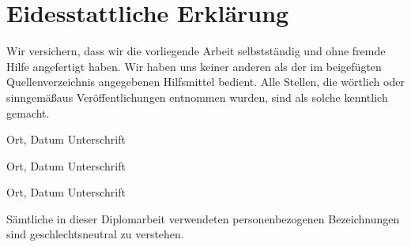 \chapter*{Eidesstattliche Erkl\"arung}

Wir versichern, dass wir die vorliegende Arbeit selbstst\"andig und ohne fremde Hilfe angefertigt haben. Wir haben uns keiner anderen als der im beigef\"ugten Quellenverzeichnis angegebenen Hilfsmittel bedient. Alle Stellen, die w\"ortlich oder sinngem\"a\ss aus Ver\"offentlichungen entnommen wurden, sind als solche kenntlich gemacht.


\vspace{2.5cm}

\hspace{2cm} Ort, Datum \hfill Unterschrift \hspace{2cm}

\vspace{2cm}

\hspace{2cm} Ort, Datum \hfill Unterschrift \hspace{2cm}

\vspace{2cm}

\hspace{2cm} Ort, Datum \hfill Unterschrift \hspace{2cm}

\vspace{2cm}

\begin{center}
S\"amtliche in dieser Diplomarbeit verwendeten personenbezogenen Bezeichnungen sind geschlechtsneutral zu verstehen.
\end{center}